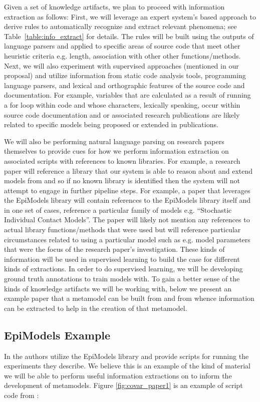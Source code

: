 \documentclass{article}
\begin{document}
Given a set of knowledge artifacts, we plan to proceed with information extraction as follows: First, we will leverage an expert system's based approach to derive rules to automatically recognize and extract relevant phenomena; see Table~\ref{table:info_extract} for details. The rules will be built using the outputs of language parsers and applied to specific areas of source code that meet other heuristic criteria e.g. length, association with other other functions/methods. Next, we will also experiment with supervised approaches (mentioned in our proposal) and utilize information from static code analysis tools, programming language parsers, and lexical and orthographic features of the source code and documentation. For example, variables that are calculated as a result of running a for loop within code and whose characters, lexically speaking, occur within source code documentation and or associated research publications are likely related to specific models being proposed or extended in publications.

We will also be performing natural language parsing \cite{manning} on research papers themselves to provide cues for how we perform information extraction on associated scripts with references to known libraries. For example, a research paper will reference a library that our system is able to reason about and extend models from and so if no known library is identified then the system will not attempt to engage in further pipeline steps. For example, a paper that leverages the EpiModels library will contain references to the EpiModels library itself and in one set of cases, reference a particular family of models e.g. ``Stochastic Individual Contact Models''. The paper will likely not mention any references to actual library functions/methods that were used but will reference particular circumstances related to using a particular model such as e.g. model parameters that were the focus of the research paper's investigation. These kinds of information will be used in supervised learning to build the case for different kinds of extractions. In order to do supervised learning, we will be developing ground truth annotations to train models with. To gain a better sense of the kinds of knowledge artifacts we will be working with, below we present an example paper that a metamodel can be built from and from whence information can be extracted to help in the creation of that metamodel.

\subsection{EpiModels Example}
In \cite{doi:10.1111/oik.04527} the authors utilize the EpiModels library and provide scripts for running the experiments they describe. We believe this is an example of the kind of material we will be able to perform useful information extractions on to inform the development of metamodels. Figure \ref{fig:covar_paper1} is an example of script code from \cite{doi:10.1111/oik.04527}:
\end{document}
